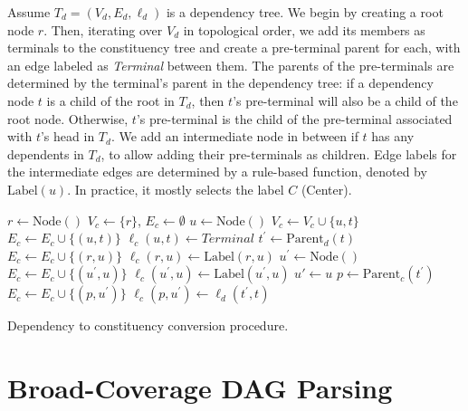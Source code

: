 \documentclass[11pt]{article}
\begin{document}
Assume $T_d=(V_d,E_d,\ell_d)$ is a dependency tree.
We begin by creating a root node $r$.
Then, iterating over $V_d$ in topological order,
we add its members as terminals to the constituency tree
and create a pre-terminal parent for each,
with an edge labeled as \textit{Terminal} between them.
The parents of the pre-terminals are determined by the terminal's parent in the dependency
tree: if a dependency node $t$ is a child of the root in $T_d$, then $t$'s pre-terminal will also be a child of the root node. Otherwise, $t$'s pre-terminal is the child of the pre-terminal associated with $t$'s head in $T_d$. We add an intermediate node in between if $t$ has any dependents in $T_d$,
to allow adding their pre-terminals as children.
Edge labels for the intermediate edges are determined by a rule-based function, denoted by $\mathrm{Label}(u)$.
In practice, it mostly selects the label $C$ (Center).

\begin{algorithm}
  \small
 $r \leftarrow \mathrm{Node()}$\;
 $V_c \leftarrow \{r\}$,
 $E_c \leftarrow \emptyset$\;
  {
  $u \leftarrow \mathrm{Node()}$\;
  $V_c \leftarrow V_c \cup \{u, t\}$\;
  $E_c \leftarrow E_c \cup \{(u, t)\}$\;
  $\ell_c(u,t)\leftarrow\mathit{Terminal}$\;
  $t^\prime \leftarrow \mathrm{Parent}_d(t)$\;
   {
   $E_c \leftarrow E_c \cup \{(r, u)\}$\;
   $\ell_c(r, u) \leftarrow \mathrm{Label}(r,u)$\;
  } {
    {
    $u^\prime \leftarrow \mathrm{Node()}$\;
    $E_c \leftarrow E_c \cup \{(u^\prime, u)\}$\;
    $\ell_c(u^\prime, u) \leftarrow \mathrm{Label}(u^\prime, u)$\;
   } {
    $u' \leftarrow u$\;
   }
   $p \leftarrow \mathrm{Parent}_c(t^\prime)$\;
   $E_c \leftarrow E_c \cup \{(p, u^\prime)\}$\;
   $\ell_c(p, u^\prime) \leftarrow \ell_d(t^\prime, t)$\;
  }
 }
 \caption{\small Dependency to constituency conversion procedure.}
 \label{alg:dep2con}
\end{algorithm}


\section{Broad-Coverage DAG Parsing}\label{sec:direct_approach}
\end{document}
